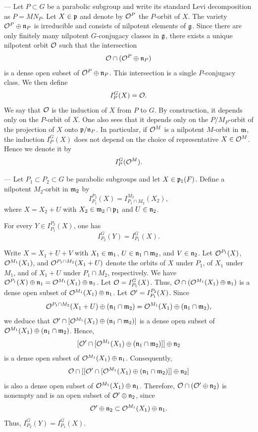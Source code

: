 \begin{paragr} --- Let $P\subset G$ be a parabolic subgroup and write its standard Levi decomposition as $P=MN_P$. Let $X\in \mathfrak{p}$ and denote by $\mathcal{O}^P$ the $P$-orbit of $X$. The variety $\mathcal{O}^P\oplus\mathfrak{n}_P$ is irreducible and consists of nilpotent elements of $\mathfrak{g}$. Since there are only finitely many nilpotent $G$-conjugacy classes in $\mathfrak{g}$, there exists a unique nilpotent orbit $\mathcal{O}$ such that the intersection
$$\mathcal{O}\cap (\mathcal{O}^P\oplus \mathfrak{n}_P)$$
is a dense open subset of $\mathcal{O}^P\oplus \mathfrak{n}_P$. This intersection is a single $P$-conjugacy class. We then define
$$I_P^G(X)=\mathcal{O}.$$
We say that $\mathcal{O}$ is the induction of $X$ from $P$ to $G$. By construction, it depends only on the $P$-orbit of $X$. One also sees that it depends only on the $P/M_P$-orbit of the projection of $X$ onto $\mathfrak{p}/\mathfrak{n}_P$. In particular, if $\mathcal{O}^M$ is a nilpotent $M$-orbit in $\mathfrak{m}$, the induction $I_P^G(X)$ does not depend on the choice of representative $X\in \mathcal{O}^M$. Hence we denote it by
$$I_P^G(\mathcal{O}^M).$$
\end{paragr}

\begin{paragr}[Transitivity.] --- Let $P_1\subset P_2\subset G$ be parabolic subgroups and let $X\in \mathfrak{p}_1(F)$. Define a nilpotent $M_2$-orbit in $\mathfrak{m}_2$ by
$$I_{P_1}^{P_2}(X)=I_{P_1\cap M_2}^{M_2}(X_2),$$
where $X=X_2+U$ with $X_2\in \mathfrak{m}_2\cap\mathfrak{p}_1$ and $U\in \mathfrak{n}_2$. 

\begin{lemme}\label{lem:transitivite}
For every $Y\in I_{P_1}^{P_2}(X)$, one has 
$$I_{P_2}^G(Y)=I_{P_1}^G(X).$$
\end{lemme}
  
\begin{preuve}
Write $X=X_1+U+V$ with $X_1\in \mathfrak{m}_1$, $U\in \mathfrak{n}_1\cap \mathfrak{m}_2$, and $V\in \mathfrak{n}_2$. Let $\mathcal{O}^{P_1}(X)$, $\mathcal{O}^{M_1}(X_1)$, and $\mathcal{O}^{P_1\cap M_2}(X_1+U)$ denote the orbits of $X$ under $P_1$, of $X_1$ under $M_1$, and of $X_1+U$ under $P_1\cap M_2$, respectively. We have $\mathcal{O}^{P_1}(X)\oplus\mathfrak{n}_1=\mathcal{O}^{M_1}(X_1)\oplus \mathfrak{n}_1$. Let $\mathcal{O}=I_{P_1}^G(X)$. Thus, $\mathcal{O}\cap (\mathcal{O}^{M_1}(X_1)\oplus \mathfrak{n}_1)$ is a dense open subset of $\mathcal{O}^{M_1}(X_1)\oplus \mathfrak{n}_1$. Let $\mathcal{O}'=I_{P_1}^{P_2}(X)$. Since
$$\mathcal{O}^{P_1\cap M_2}(X_1+U)\oplus (\mathfrak{n}_1\cap \mathfrak{m}_2)=\mathcal{O}^{M_1}(X_1)\oplus (\mathfrak{n}_1\cap \mathfrak{m}_2),$$
we deduce that $\mathcal{O}'\cap [\mathcal{O}^{M_1}(X_1)\oplus (\mathfrak{n}_1\cap \mathfrak{m}_2)]$ is a dense open subset of $\mathcal{O}^{M_1}(X_1)\oplus (\mathfrak{n}_1\cap \mathfrak{m}_2)$. Hence,
$$[\mathcal{O}'\cap [\mathcal{O}^{M_1}(X_1)\oplus (\mathfrak{n}_1\cap \mathfrak{m}_2)]]\oplus \mathfrak{n}_2$$
is a dense open subset of $\mathcal{O}^{M_1}(X_1)\oplus \mathfrak{n}_1$. Consequently, 
$$\mathcal{O}\cap [[\mathcal{O}'\cap [\mathcal{O}^{M_1}(X_1)\oplus (\mathfrak{n}_1\cap \mathfrak{m}_2)]]\oplus \mathfrak{n}_2]$$
is also a dense open subset of $\mathcal{O}^{M_1}(X_1)\oplus \mathfrak{n}_1$. Therefore, $\mathcal{O}\cap (\mathcal{O}'\oplus \mathfrak{n}_2)$ is nonempty and is an open subset of $\mathcal{O}'\oplus \mathfrak{n}_2$, since
$$\mathcal{O}'\oplus \mathfrak{n}_2\subset \mathcal{O}^{M_1}(X_1)\oplus \mathfrak{n}_1.$$ 
Thus, $I_{P_2}^G(Y)=I_{P_1}^G(X)$.
\end{preuve}
\end{paragr}

